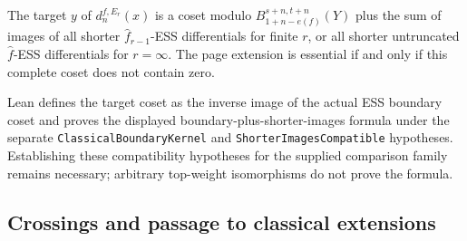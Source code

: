 \begin{definition}
  \label{def:page-extension-coset}
  \notready
  The target $y$ of $d_n^{f,E_r}(x)$ is a coset modulo
  $B_{1+n-e(f)}^{s+n,t+n}(Y)$ plus the sum of images of all shorter
  $\widehat f_{r-1}$-ESS differentials for finite $r$, or all shorter
  untruncated $\widehat f$-ESS differentials for $r=\infty$.  The page
  extension is essential if and only if this complete coset does not contain
  zero.

  Lean defines the target coset as the inverse image of the actual ESS
  boundary coset and proves the displayed boundary-plus-shorter-images
  formula under the separate \texttt{ClassicalBoundaryKernel} and
  \texttt{ShorterImagesCompatible} hypotheses.  Establishing these
  compatibility hypotheses for the supplied comparison family remains
  necessary; arbitrary top-weight isomorphisms do not prove the formula.
\end{definition}

\subsection{Crossings and passage to classical extensions}

